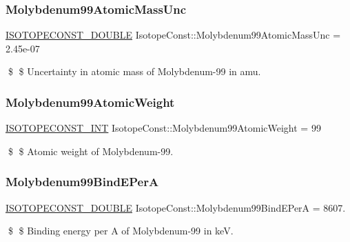 \subsubsection{\texorpdfstring{Molybdenum99\+Atomic\+Mass\+Unc}{Molybdenum99AtomicMassUnc}}
{\footnotesize\ttfamily \mbox{\hyperlink{group___isotope_const-_macros_ga8f45a7272ce02c0b4c65c44636ed719a}{I\+S\+O\+T\+O\+P\+E\+C\+O\+N\+S\+T\+\_\+\+D\+O\+U\+B\+LE}} Isotope\+Const\+::\+Molybdenum99\+Atomic\+Mass\+Unc = 2.\+45e-\/07}

\$ \$ Uncertainty in atomic mass of Molybdenum-\/99 in amu. \mbox{\label{group___isotope_const-_molybdenum-_mo99_gafb7a82bf47cefdade667b46e3c37ce9b}} 
\subsubsection{\texorpdfstring{Molybdenum99\+Atomic\+Weight}{Molybdenum99AtomicWeight}}
{\footnotesize\ttfamily \mbox{\hyperlink{group___isotope_const-_macros_ga5f18360b3e99483a35c32d789e62621c}{I\+S\+O\+T\+O\+P\+E\+C\+O\+N\+S\+T\+\_\+\+I\+NT}} Isotope\+Const\+::\+Molybdenum99\+Atomic\+Weight = 99}

\$ \$ Atomic weight of Molybdenum-\/99. \mbox{\label{group___isotope_const-_molybdenum-_mo99_gaa4963d4f8ed0fa0d117d5937c37b2b28}} 
\subsubsection{\texorpdfstring{Molybdenum99\+Bind\+E\+PerA}{Molybdenum99BindEPerA}}
{\footnotesize\ttfamily \mbox{\hyperlink{group___isotope_const-_macros_ga8f45a7272ce02c0b4c65c44636ed719a}{I\+S\+O\+T\+O\+P\+E\+C\+O\+N\+S\+T\+\_\+\+D\+O\+U\+B\+LE}} Isotope\+Const\+::\+Molybdenum99\+Bind\+E\+PerA = 8607.}

\$ \$ Binding energy per A of Molybdenum-\/99 in keV. \mbox{\label{group___isotope_const-_molybdenum-_mo99_ga4831990ba352bfbcdbaa43ddada32390}} 
